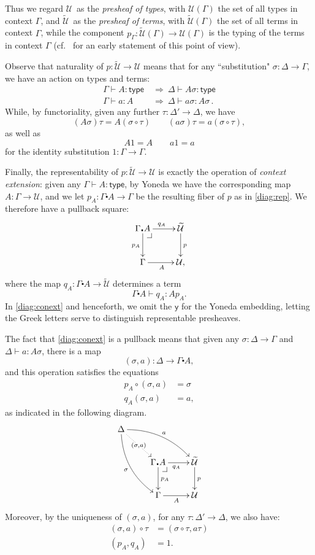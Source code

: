 \documentclass[12pt]{article}
\makeatletter
\newcommand{\pbcorner}[1][dr]{\save*!/#1-1.2pc/#1:(-1,1)@^{|-}\restore}
\newcommand{\y}{\ensuremath{\mathsf{y}}}
\newcommand{\G}{\ensuremath{\Gamma}}
\newcommand{\type}{\mathsf{type}}
\newcommand{\types}[2]{#1 \vdash #2:\type}
\newcommand{\Gtypes}[1]{\types{\Gamma}{#1}}
\newcommand{\terms}[2]{#1 \vdash #2}
\newcommand{\Gterms}[1]{\terms{\Gamma}{#1}}
\newcommand{\ext}[2]{{#1\!\centerdot\! #2}}
\newcommand{\U}{\ensuremath{\mathcal{U}}}
\newcommand{\UU}{\ensuremath{\widetilde{\mathcal{U}}}}
\theoremstyle{definition}
\makeatother
\begin{document}
Thus we regard \U\ as the \emph{presheaf of types}, with $\U(\G)$ the set of all types in context $\G$, and \UU\ as the \emph{presheaf of terms}, with $\UU(\G)$ the set of all terms in context $\G$, while the component $p_{\G} : \UU(\G) \to \U(\G)$ is the typing of the terms in context $\G$ (cf.~\cite{Hofmann2} for an early statement of this point of view).

Observe that naturality of $p : \UU\to\U$ means that for any ``substitution" $\sigma:\Delta\to\G$, we have an action on types and terms:
\begin{align*}
\Gtypes{A}\ &\Rightarrow\ \types{\Delta}{A\sigma}\\
\Gterms{a:A}\ &\Rightarrow\ \terms{\Delta}{a\sigma : A\sigma}\,.
\end{align*}
While, by functoriality, given any further $\tau: \Delta'\to\Delta$, we have
\[
(A\sigma)\tau = A(\sigma\circ\tau) \qquad (a\sigma)\tau = a(\sigma\circ\tau),
\]
as well as
\[
A1 = A \qquad a1 = a
\]
for the identity substitution $1 : \G\to\G$.

Finally, the representability of $p : \UU\to\U$ is exactly the operation of \emph{context extension}: given any $\Gtypes{A}$, by Yoneda we have the corresponding map $A : \G \to \U$, and we let $p_A: \ext{\G}{A} \to \G$ be the resulting fiber of $p$ as in \eqref{diag:rep}.  We therefore have a pullback square:
%
\begin{equation}\label{diag:conext}
\xymatrix{
\ext{\G}{A} \ar[d]_{p_A} \ar[r]^{q_A} \pbcorner &  \UU \ar[d]^{p}\\
\G \ar[r]_{A}   & \U ,}
\end{equation}
%
where the map $q_A : \ext{\G}{A}\to\UU$ determines a term 
$$\terms{\ext{\G}{A}}{q_A:Ap_A}.$$
%
In \eqref{diag:conext} and henceforth, we omit the $\y$ for the Yoneda embedding, letting the Greek letters serve to distinguish representable presheaves.
\medskip

The fact that \eqref{diag:conext} is a pullback means that given any $\sigma: \Delta\to\G$ and $\terms{\Delta}{a:A\sigma}$, there is a map $$(\sigma, a):\Delta\to\ext{\G}{A},$$ and this operation satisfies the equations
\begin{align*}
p_A\circ(\sigma,a) &= \sigma \\
q_A(\sigma,a) &= a,
\end{align*}
as indicated in the following diagram.
%
\begin{equation*}
\xymatrix{
\Delta  \ar@/{}_{1pc}/[ddr]_{\sigma} \ar@{.>}[dr]|-{(\sigma,a)} \ar@/{}^{1pc}/[drr]^{a} \\
& \ext{\G}{A} \ar[d]^{p_A} \ar[r]_{q_A} \pbcorner &  \UU \ar[d]^{p}\\
& \G \ar[r]_{A}   & \U }
\end{equation*}
%
Moreover, by the uniqueness of $(\sigma,a)$, for any $\tau: \Delta'\to\Delta$, we also have:
\begin{align*}
(\sigma,a)\circ\tau &= (\sigma\circ\tau,a\tau)\\
(p_A,q_A) &= 1.
\end{align*}
\end{document}

